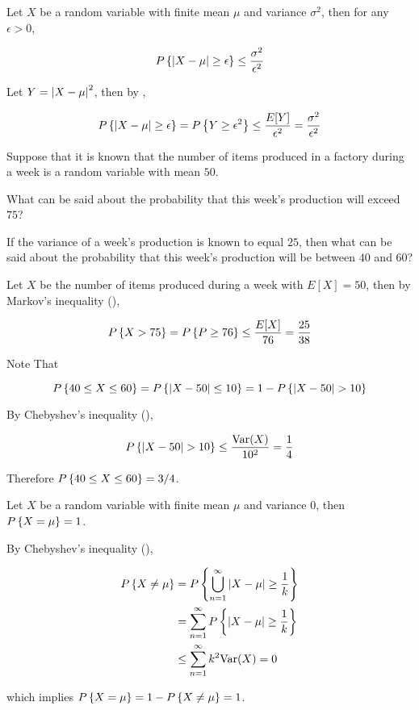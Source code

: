 \documentclass[a4paper,12pt]{article}
\begin{document}
\begin{thm}
  Let $X$ be a random variable with finite mean $\mu$ and variance $\sigma^{2}$, then for any $\epsilon>0$,

  $$P\left\{ \left| X-\mu\right|\geq\epsilon\right\}\leq\frac{\sigma^{2}}{\epsilon^{2}}$$\s

  \prf Let $Y=\left| X-\mu\right|^{2}$, then by \rthm[\sctr{1}],

  $$P\left\{ \left| X-\mu\right|\geq\epsilon\right\}=P\left\{ Y\geq\epsilon^{2}\right\}\leq\frac{E[Y]}{\epsilon^{2}}=\frac{\sigma^{2}}{\epsilon^{2}}$$
\end{thm}\n

\begin{exm}
  Suppose that it is known that the number of items produced in a factory during a week is a random variable with mean $50$.

  \begin{alist}
  \item What can be said about the probability that this week’s production will exceed $75$?
  \item If the variance of a week’s production is known to equal $25$, then what can be said about the probability that this week’s production will be between $40$ and $60$?
  \end{alist}

  \ans{} Let $X$ be the number of items produced during a week with $E[X]=50$, then by Markov's inequality (\rthm[\sctr{2}]),

  $$P\left\{ X>75\right\}=P\left\{ P\geq 76\right\}\leq\frac{E[X]}{76}=\frac{25}{38}$$\s

   Note That
  
  $$P\brc{40\leq X\leq 60}=P\brc{\abs{X-50}\leq 10}=1-P\brc{\abs{X-50}>10}$$\s

  By Chebyshev's inequality (\rthm[\sctr{1}]),

  $$P\brc{\abs{X-50}>10}\leq\frac{\mathrm{Var}(X)}{10^{2}}=\frac{1}{4}$$\s

  Therefore $P\left\{ 40\leq X\leq 60\right\}=3/4$.
\end{exm}\n

\begin{pst}
  Let $X$ be a random variable with finite mean $\mu$ and variance $0$, then $P\left\{ X=\mu\right\}=1$.\n

  \prf By Chebyshev's inequality (\rthm[\sctr{2}]),

  $$\begin{aligned}[t]
    P\left\{ X\neq\mu\right\}&=P\left\{ \bigcup_{n=1}^{\infty}\left| X-\mu\right|\geq\frac{1}{k}\right\}\\
    &=\sum_{n=1}^{\infty}P\left\{ \left| X-\mu\right|\geq\frac{1}{k}\right\}\\
    &\leq\sum_{n=1}^{\infty}k^{2}\mathrm{Var}(X)=0
  \end{aligned}$$\s

  which implies $P\left\{ X=\mu\right\}=1-P\left\{ X\neq\mu\right\}=1$.
\end{pst}
\end{document}
